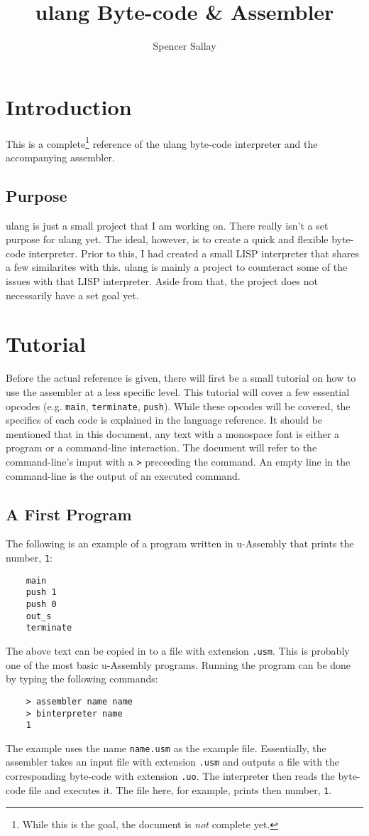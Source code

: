 \documentclass[12pt]{report}
\title{ulang Byte-code \& Assembler}
\author{Spencer Sallay}
\begin{document}
  \maketitle
  \tableofcontents
  \newpage
  \chapter{Introduction}
  This is a complete\footnote{While this is the goal, the document is \emph{not} 
  complete yet.} reference of the ulang byte-code interpreter and the
  accompanying assembler.
  \section{Purpose}
  ulang is just a small project that I am working on.  There really isn't a set purpose
  for ulang yet.  The ideal, however, is to create a quick and flexible byte-code
  interpreter.  Prior to this, I had created a small LISP interpreter that shares a few 
  similarites with this.  ulang is mainly a project to counteract some of the issues with
  that LISP interpreter.  Aside from that, the project does not necessarily have a set
  goal yet.
  \chapter{Tutorial}
  Before the actual reference is given, there will first be a small tutorial on how to
  use the assembler at a less specific level.  This tutorial will cover a few essential
  opcodes (e.g. \verb|main|, \verb|terminate|, \verb|push|).  While these opcodes
  will be covered, the specifics of each code is explained in the language reference.
  It should be mentioned that in this document, any text with a monospace font is
  either a program or a command-line interaction.  The document will refer to the
  command-line's imput with a \verb|>| preceeding the command.  An empty line
  in the command-line is the output of an executed command.
  \newpage
  \section{A First Program}
  The following is an example of a program written in u-Assembly that prints the number,
  \verb|1|: 
  \begin{verbatim}
	main
	push 1
	push 0
	out_s
	terminate
  \end{verbatim}
  The above text can be copied in to a file with extension \verb|.usm|.  This is
  probably one of the most basic u-Assembly programs.  Running the program can be done
  by typing the following commands:
  \begin{verbatim}
	> assembler name name
	> binterpreter name
	1
  \end{verbatim}
  The example uses the name \verb|name.usm| as the example file.  Essentially, the
  assembler takes an input file with extension \verb|.usm| and outputs a file with the
  corresponding byte-code with extension \verb|.uo|.  The interpreter then reads the
  byte-code file and executes it.  The file here, for example, prints then number, 
  \verb|1|.
  
\end{document}
